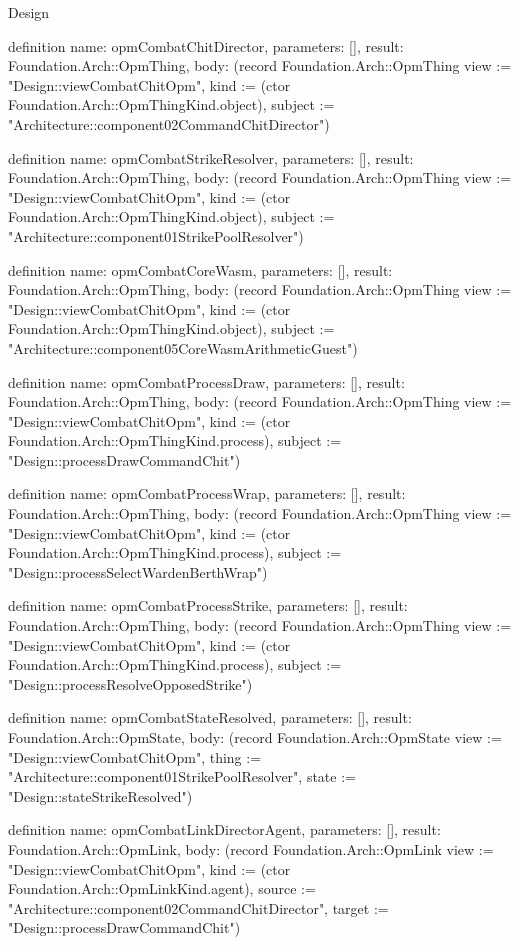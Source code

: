 \begin{lexlean}{Design}
\begin{semanticmodule}
definition{
  name: opmCombatChitDirector,
  parameters: [],
  result: Foundation.Arch::OpmThing,
  body: (record Foundation.Arch::OpmThing {view := "Design::viewCombatChitOpm", kind := (ctor Foundation.Arch::OpmThingKind.object), subject := "Architecture::component02CommandChitDirector"})
}

definition{
  name: opmCombatStrikeResolver,
  parameters: [],
  result: Foundation.Arch::OpmThing,
  body: (record Foundation.Arch::OpmThing {view := "Design::viewCombatChitOpm", kind := (ctor Foundation.Arch::OpmThingKind.object), subject := "Architecture::component01StrikePoolResolver"})
}

definition{
  name: opmCombatCoreWasm,
  parameters: [],
  result: Foundation.Arch::OpmThing,
  body: (record Foundation.Arch::OpmThing {view := "Design::viewCombatChitOpm", kind := (ctor Foundation.Arch::OpmThingKind.object), subject := "Architecture::component05CoreWasmArithmeticGuest"})
}

definition{
  name: opmCombatProcessDraw,
  parameters: [],
  result: Foundation.Arch::OpmThing,
  body: (record Foundation.Arch::OpmThing {view := "Design::viewCombatChitOpm", kind := (ctor Foundation.Arch::OpmThingKind.process), subject := "Design::processDrawCommandChit"})
}

definition{
  name: opmCombatProcessWrap,
  parameters: [],
  result: Foundation.Arch::OpmThing,
  body: (record Foundation.Arch::OpmThing {view := "Design::viewCombatChitOpm", kind := (ctor Foundation.Arch::OpmThingKind.process), subject := "Design::processSelectWardenBerthWrap"})
}

definition{
  name: opmCombatProcessStrike,
  parameters: [],
  result: Foundation.Arch::OpmThing,
  body: (record Foundation.Arch::OpmThing {view := "Design::viewCombatChitOpm", kind := (ctor Foundation.Arch::OpmThingKind.process), subject := "Design::processResolveOpposedStrike"})
}

definition{
  name: opmCombatStateResolved,
  parameters: [],
  result: Foundation.Arch::OpmState,
  body: (record Foundation.Arch::OpmState {view := "Design::viewCombatChitOpm", thing := "Architecture::component01StrikePoolResolver", state := "Design::stateStrikeResolved"})
}

definition{
  name: opmCombatLinkDirectorAgent,
  parameters: [],
  result: Foundation.Arch::OpmLink,
  body: (record Foundation.Arch::OpmLink {view := "Design::viewCombatChitOpm", kind := (ctor Foundation.Arch::OpmLinkKind.agent), source := "Architecture::component02CommandChitDirector", target := "Design::processDrawCommandChit"})
}


\end{semanticmodule}
\end{lexlean}
